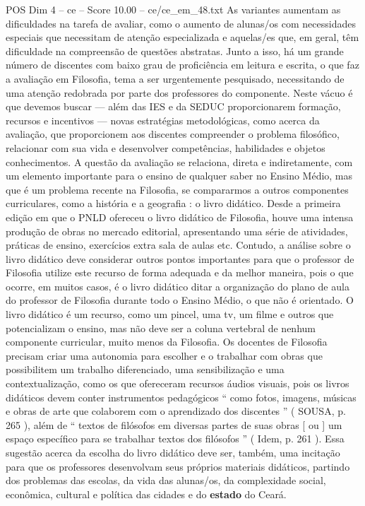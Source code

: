 \begin{textsample}{POS Dim 4 – ce – Score 10.00 – ce/ce\_em\_48.txt}
As variantes aumentam as dificuldades na tarefa de avaliar, como o aumento de alunas/os com necessidades especiais que necessitam de atenção especializada e aquelas/es que, em geral, têm dificuldade na compreensão de questões abstratas.
Junto a isso, há um grande número de discentes com baixo grau de proficiência em leitura e escrita, o que faz a avaliação em Filosofia, tema a ser urgentemente pesquisado, necessitando de uma atenção redobrada por parte dos professores do componente.
Neste vácuo é que devemos buscar — além das IES e da SEDUC proporcionarem formação, recursos e incentivos — novas estratégias metodológicas, como acerca da avaliação, que proporcionem aos discentes compreender o problema filosófico, relacionar com sua vida e desenvolver competências, habilidades e objetos conhecimentos.
A questão da avaliação se relaciona, direta e indiretamente, com um elemento importante para o ensino de qualquer saber no Ensino Médio, mas que é um problema recente na Filosofia, se compararmos a outros componentes curriculares, como a história e a geografia : o livro didático.
Desde a primeira edição em que o PNLD ofereceu o livro didático de Filosofia, houve uma intensa produção de obras no mercado editorial, apresentando uma série de atividades, práticas de ensino, exercícios extra sala de aulas etc.
Contudo, a análise sobre o livro didático deve considerar outros pontos importantes para que o professor de Filosofia utilize este recurso de forma adequada e da melhor maneira, pois o que ocorre, em muitos casos, é o livro didático ditar a organização do plano de aula do professor de Filosofia durante todo o Ensino Médio, o que não é orientado.
O livro didático é um recurso, como um pincel, uma tv, um filme e outros que potencializam o ensino, mas não deve ser a coluna vertebral de nenhum componente curricular, muito menos da Filosofia.
Os docentes de Filosofia precisam criar uma autonomia para escolher e o trabalhar com obras que possibilitem um trabalho diferenciado, uma sensibilização e uma contextualização, como os que ofereceram recursos áudios visuais, pois os livros didáticos devem conter instrumentos pedagógicos “ como fotos, imagens, músicas e obras de arte que colaborem com o aprendizado dos discentes ” ( SOUSA, p. 265 ), além de “ textos de filósofos em diversas partes de suas obras [ ou ] um espaço específico para se trabalhar textos dos filósofos ” ( Idem, p. 261 ).
Essa sugestão acerca da escolha do livro didático deve ser, também, uma incitação para que os professores desenvolvam seus próprios materiais didáticos, partindo dos problemas das escolas, da vida das alunas/os, da complexidade social, econômica, cultural e política das cidades e do \textbf{estado} do Ceará.

\end{textsample}

